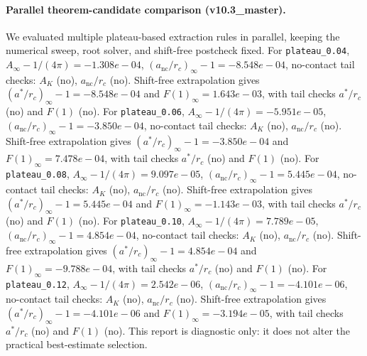 \paragraph{Parallel theorem-candidate comparison (v10.3_master).}
We evaluated multiple plateau-based extraction rules in parallel, keeping the numerical sweep, root solver, and shift-free postcheck fixed. For \texttt{plateau_0.04}, $A_\infty-1/(4\pi)=-1.308e-04$, $(a_{\mathrm{nc}}/r_c)_\infty-1=-8.548e-04$, no-contact tail checks: $A_K$ (no), $a_{\mathrm{nc}}/r_c$ (no). Shift-free extrapolation gives $(a^*/r_c)_\infty-1=-8.548e-04$ and $F(1)_\infty=1.643e-03$, with tail checks $a^*/r_c$ (no) and $F(1)$ (no). For \texttt{plateau_0.06}, $A_\infty-1/(4\pi)=-5.951e-05$, $(a_{\mathrm{nc}}/r_c)_\infty-1=-3.850e-04$, no-contact tail checks: $A_K$ (no), $a_{\mathrm{nc}}/r_c$ (no). Shift-free extrapolation gives $(a^*/r_c)_\infty-1=-3.850e-04$ and $F(1)_\infty=7.478e-04$, with tail checks $a^*/r_c$ (no) and $F(1)$ (no). For \texttt{plateau_0.08}, $A_\infty-1/(4\pi)=9.097e-05$, $(a_{\mathrm{nc}}/r_c)_\infty-1=5.445e-04$, no-contact tail checks: $A_K$ (no), $a_{\mathrm{nc}}/r_c$ (no). Shift-free extrapolation gives $(a^*/r_c)_\infty-1=5.445e-04$ and $F(1)_\infty=-1.143e-03$, with tail checks $a^*/r_c$ (no) and $F(1)$ (no). For \texttt{plateau_0.10}, $A_\infty-1/(4\pi)=7.789e-05$, $(a_{\mathrm{nc}}/r_c)_\infty-1=4.854e-04$, no-contact tail checks: $A_K$ (no), $a_{\mathrm{nc}}/r_c$ (no). Shift-free extrapolation gives $(a^*/r_c)_\infty-1=4.854e-04$ and $F(1)_\infty=-9.788e-04$, with tail checks $a^*/r_c$ (no) and $F(1)$ (no). For \texttt{plateau_0.12}, $A_\infty-1/(4\pi)=2.542e-06$, $(a_{\mathrm{nc}}/r_c)_\infty-1=-4.101e-06$, no-contact tail checks: $A_K$ (no), $a_{\mathrm{nc}}/r_c$ (no). Shift-free extrapolation gives $(a^*/r_c)_\infty-1=-4.101e-06$ and $F(1)_\infty=-3.194e-05$, with tail checks $a^*/r_c$ (no) and $F(1)$ (no). This report is diagnostic only: it does not alter the practical best-estimate selection.
